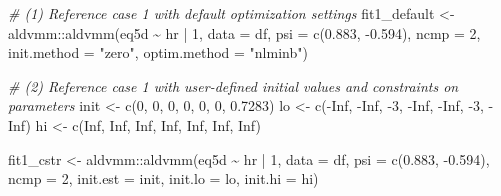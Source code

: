 \documentclass[
]{article}
\newenvironment{Shaded}{\begin{snugshade}}{\end{snugshade}}
\newcommand{\AttributeTok}[1]{\textcolor[rgb]{0.77,0.63,0.00}{#1}}
\newcommand{\CommentTok}[1]{\textcolor[rgb]{0.56,0.35,0.01}{\textit{#1}}}
\newcommand{\ConstantTok}[1]{\textcolor[rgb]{0.00,0.00,0.00}{#1}}
\newcommand{\DecValTok}[1]{\textcolor[rgb]{0.00,0.00,0.81}{#1}}
\newcommand{\FloatTok}[1]{\textcolor[rgb]{0.00,0.00,0.81}{#1}}
\newcommand{\FunctionTok}[1]{\textcolor[rgb]{0.00,0.00,0.00}{#1}}
\newcommand{\NormalTok}[1]{#1}
\newcommand{\OtherTok}[1]{\textcolor[rgb]{0.56,0.35,0.01}{#1}}
\newcommand{\SpecialCharTok}[1]{\textcolor[rgb]{0.00,0.00,0.00}{#1}}
\newcommand{\StringTok}[1]{\textcolor[rgb]{0.31,0.60,0.02}{#1}}
\begin{document}
\begin{Shaded}
\begin{Highlighting}[]
\CommentTok{\# (1) Reference case 1 with default optimization settings}
\NormalTok{fit1\_default }\OtherTok{\textless{}{-}}\NormalTok{ aldvmm}\SpecialCharTok{::}\FunctionTok{aldvmm}\NormalTok{(eq5d }\SpecialCharTok{\textasciitilde{}}\NormalTok{ hr }\SpecialCharTok{|} \DecValTok{1}\NormalTok{,}
                               \AttributeTok{data =}\NormalTok{ df,}
                               \AttributeTok{psi =} \FunctionTok{c}\NormalTok{(}\FloatTok{0.883}\NormalTok{, }\SpecialCharTok{{-}}\FloatTok{0.594}\NormalTok{),}
                               \AttributeTok{ncmp =} \DecValTok{2}\NormalTok{,}
                               \AttributeTok{init.method =} \StringTok{"zero"}\NormalTok{,}
                               \AttributeTok{optim.method =} \StringTok{"nlminb"}\NormalTok{)}

\CommentTok{\# (2) Reference case 1 with user{-}defined initial values and constraints on parameters}
\NormalTok{init }\OtherTok{\textless{}{-}} \FunctionTok{c}\NormalTok{(}\DecValTok{0}\NormalTok{,    }\DecValTok{0}\NormalTok{,   }\DecValTok{0}\NormalTok{,   }\DecValTok{0}\NormalTok{,    }\DecValTok{0}\NormalTok{,    }\DecValTok{0}\NormalTok{,    }\FloatTok{0.7283}\NormalTok{)}
\NormalTok{lo   }\OtherTok{\textless{}{-}} \FunctionTok{c}\NormalTok{(}\SpecialCharTok{{-}}\ConstantTok{Inf}\NormalTok{, }\SpecialCharTok{{-}}\ConstantTok{Inf}\NormalTok{, }\SpecialCharTok{{-}}\DecValTok{3}\NormalTok{,  }\SpecialCharTok{{-}}\ConstantTok{Inf}\NormalTok{, }\SpecialCharTok{{-}}\ConstantTok{Inf}\NormalTok{, }\SpecialCharTok{{-}}\DecValTok{3}\NormalTok{, }\SpecialCharTok{{-}}\ConstantTok{Inf}\NormalTok{)}
\NormalTok{hi   }\OtherTok{\textless{}{-}} \FunctionTok{c}\NormalTok{(}\ConstantTok{Inf}\NormalTok{,  }\ConstantTok{Inf}\NormalTok{,  }\ConstantTok{Inf}\NormalTok{, }\ConstantTok{Inf}\NormalTok{,  }\ConstantTok{Inf}\NormalTok{,  }\ConstantTok{Inf}\NormalTok{,  }\ConstantTok{Inf}\NormalTok{)}

\NormalTok{fit1\_cstr }\OtherTok{\textless{}{-}}\NormalTok{ aldvmm}\SpecialCharTok{::}\FunctionTok{aldvmm}\NormalTok{(eq5d }\SpecialCharTok{\textasciitilde{}}\NormalTok{ hr }\SpecialCharTok{|} \DecValTok{1}\NormalTok{,}
                            \AttributeTok{data =}\NormalTok{ df,}
                            \AttributeTok{psi =} \FunctionTok{c}\NormalTok{(}\FloatTok{0.883}\NormalTok{, }\SpecialCharTok{{-}}\FloatTok{0.594}\NormalTok{),}
                            \AttributeTok{ncmp =} \DecValTok{2}\NormalTok{,}
                            \AttributeTok{init.est =}\NormalTok{ init,}
                            \AttributeTok{init.lo =}\NormalTok{ lo,}
                            \AttributeTok{init.hi =}\NormalTok{ hi)}


\end{Highlighting}
\end{Shaded}
\end{document}

